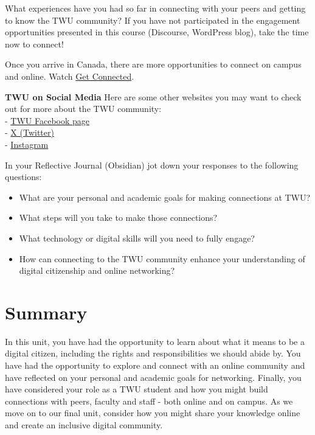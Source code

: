 \documentclass[
]{book}
\providecommand{\tightlist}{%
  \setlength{\itemsep}{0pt}\setlength{\parskip}{0pt}}
\theoremstyle{definition}
\theoremstyle{definition}
\theoremstyle{definition}
\theoremstyle{definition}
\theoremstyle{remark}
\begin{document}
\begin{reflect}
What experiences have you had so far in connecting with your peers and getting to know the TWU community? If you have not participated in the engagement opportunities presented in this course (Discourse, WordPress blog), take the time now to connect!

Once you arrive in Canada, there are more opportunities to connect on campus and online. Watch \href{https://vimeo.com/584977176/f1938444cb}{Get Connected}.

\textbf{TWU on Social Media}
Here are some other websites you may want to check out for more about the TWU community:\\
- \href{facebook.com/trinitywestern}{TWU Facebook page}\\
- \href{twitter.com/trinitywestern}{X (Twitter)}\\
- \href{instagram.com/trinitywestern}{Instagram}

In your Reflective Journal (Obsidian) jot down your responses to the following questions:

\begin{itemize}
\tightlist
\item
  What are your personal and academic goals for making connections at TWU?\\
\item
  What steps will you take to make those connections?\\
\item
  What technology or digital skills will you need to fully engage?
\item
  How can connecting to the TWU community enhance your understanding of digital citizenship and online networking?
\end{itemize}
\end{reflect}

\hypertarget{summary-4}{%
\section*{Summary}\label{summary-4}}

In this unit, you have had the opportunity to learn about what it means to be a digital citizen, including the rights and responsibilities we should abide by. You have had the opportunity to explore and connect with an online community and have reflected on your personal and academic goals for networking. Finally, you have considered your role as a TWU student and how you might build connections with peers, faculty and staff - both online and on campus. As we move on to our final unit, consider how you might share your knowledge online and create an inclusive digital community.
\end{document}
